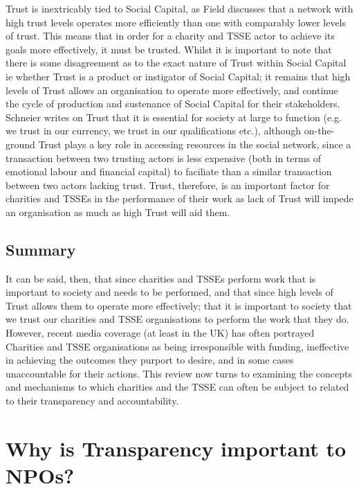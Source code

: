 Trust is inextricably tied to Social Capital, as Field discusses that a network with high trust levels operates more efficiently than one with comparably lower levels of trust. This means that in order for a charity and TSSE actor to achieve its goals more effectively, it must be trusted. Whilst it is important to note that there is some disagreement as to the exact nature of Trust within Social Capital ie whether Trust is a product or instigator of Social Capital; it remains that high levels of Trust allows an organisation to operate more effectively, and continue the cycle of production and sustenance of Social Capital for their stakeholders. Schneier writes on Trust that it is essential for society at large to function (e.g. we trust in our currency, we trust in our qualifications etc.), although on-the-ground Trust plays a key role in accessing resources in the social network, since a transaction between two trusting actors is less expensive (both in terms of emotional labour and financial capital) to faciliate than a similar transaction between two actors lacking trust. Trust, therefore, is an important factor for charities and TSSEs in the performance of their work as lack of Trust will impede an organisation as much as high Trust will aid them.


\subsection{Summary}
It can be said, then, that since charities and TSSEs perform work that is important to society and needs to be performed, and that since high levels of Trust allows them to operate more effectively; that it is important to society that we trust our charities and TSSE organisations to perform the work that they do. However, recent media coverage (at least in the UK) has often portrayed Charities and TSSE organisations as being irresponsible with funding, ineffective in achieving the outcomes they purport to desire, and in some cases unaccountable for their actions. This review now turns to examining the concepts and mechanisms to which charities and the TSSE can often be subject to related to their transparency and accountability.

\section{Why is Transparency important to NPOs?}


